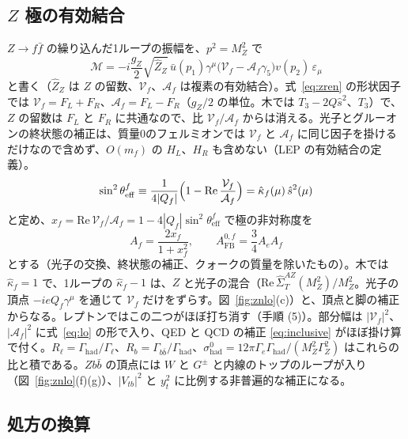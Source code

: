 \documentclass[a4paper,10pt]{ltjsarticle}
\newcommand{\re}{\mathrm{Re}\,}
\begin{document}
\subsection{$Z$ 極の有効結合}\label{sec:zpole}

$Z\to f\bar f$ の繰り込んだ1ループの振幅を、$p^2=M_Z^2$ で
\begin{equation}
\mathcal M=-i\frac{g_Z}2\sqrt{\hat Z_Z}\,\bar u(p_1)\gamma^\mu\bigl(\mathcal V_f-\mathcal A_f\gamma_5\bigr)v(p_2)\,\varepsilon_\mu
\label{eq:effcoup}
\end{equation}
と書く（$\hat Z_Z$ は $Z$ の留数、$\mathcal V_f$、$\mathcal A_f$ は複素の有効結合）。式~\eqref{eq:zren} の形状因子では $\mathcal V_f=F_L+F_R$、$\mathcal A_f=F_L-F_R$（$g_Z/2$ の単位。木では $T_3-2Q\hat s^2$、$T_3$）で、$Z$ の留数は $F_L$ と $F_R$ に共通なので、比 $\mathcal V_f/\mathcal A_f$ からは消える。光子とグルーオンの終状態の補正は、質量0のフェルミオンでは $\mathcal V_f$ と $\mathcal A_f$ に同じ因子を掛けるだけなので含めず、$O(m_f)$ の $H_L$、$H_R$ も含めない（LEP の有効結合の定義）。
\begin{equation}
\sin^2\theta^f_{\mathrm{eff}}\equiv\frac1{4|Q_f|}\Bigl(1-\re\frac{\mathcal V_f}{\mathcal A_f}\Bigr)=\hat\kappa_f(\mu)\,\hat s^2(\mu)
\label{eq:s2eff}
\end{equation}
と定め、$x_f=\re\mathcal V_f/\mathcal A_f=1-4|Q_f|\sin^2\theta^f_{\mathrm{eff}}$ で極の非対称度を
\begin{equation}
A_f=\frac{2x_f}{1+x_f^2},\qquad A^{0,f}_{\mathrm{FB}}=\frac34A_eA_f
\label{eq:asym}
\end{equation}
とする（光子の交換、終状態の補正、クォークの質量を除いたもの）。木では $\hat\kappa_f=1$ で、1ループの $\hat\kappa_f-1$ は、$Z$ と光子の混合（$\re\hat\Sigma^{AZ}_T(M_Z^2)/M_Z^2$。光子の頂点 $-ieQ_f\gamma^\mu$ を通じて $\mathcal V_f$ だけをずらす。図~\ref{fig:znlo}(c)）と、頂点と脚の補正からなる。レプトンではこの二つがほぼ打ち消す（手順 (5)）。部分幅は $|\mathcal V_f|^2$、$|\mathcal A_f|^2$ に式~\eqref{eq:lo} の形で入り、QED と QCD の補正 \eqref{eq:inclusive} がほぼ掛け算で付く。$R_\ell=\Gamma_{\mathrm{had}}/\Gamma_\ell$、$R_b=\Gamma_{b\bar b}/\Gamma_{\mathrm{had}}$、$\sigma^0_{\mathrm{had}}=12\pi\Gamma_e\Gamma_{\mathrm{had}}/(M_Z^2\Gamma_Z^2)$ はこれらの比と積である。$Z b\bar b$ の頂点には $W$ と $G^\pm$ と内線のトップのループが入り（図~\ref{fig:znlo}(f)(g)）、$|V_{tb}|^2$ と $y_t^2$ に比例する非普遍的な補正になる。

\subsection{処方の換算}\label{sec:scheme}
\end{document}
